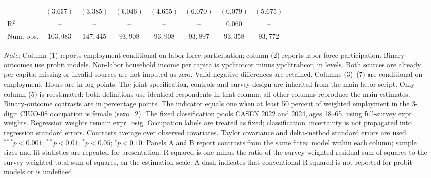 \begin{table}[htpb!]
{\begin{tabular}{l c c c c c c c}
 & $(3.657)$ & $(3.385)$ & $(6.046)$ & $(4.655)$ & $(6.070)$ & $(0.079)$ & $(5.675)$ \\
\hline
R$^2$ & -- & -- & -- & -- & -- & $0.060$ & -- \\
Num. obs. & $103,083$ & $147,445$ & $93,908$ & $93,908$ & $93,897$ & $93,358$ & $93,772$ \\
\hline
\end{tabular}%
}
\par\vspace{1ex}
\begin{minipage}{\textwidth}\footnotesize\raggedright
\textit{Note:} Column (1) reports employment conditional on labor-force participation; column (2) reports labor-force participation. Binary outcomes use probit models. Non-labor household income per capita is ypchtotcor minus ypchtrabcor, in levels. Both sources are already per capita; missing or invalid sources are not imputed as zero. Valid negative differences are retained.  Columns (3)--(7) are conditional on employment. Hours are in log points. The joint specification, controls and survey design are inherited from the main labor script. Only column (5) is reestimated: both definitions use identical respondents in that column; all other columns reproduce the main estimates. Binary-outcome contrasts are in percentage points. The indicator equals one when at least 50 percent of weighted employment in the 3-digit CIUO-08 occupation is female (sexo=2). The fixed classification pools CASEN 2022 and 2024, ages 18--65, using full-survey expr weights. Regression weights remain expr\_osig. Occupation labels are treated as fixed; classification uncertainty is not propagated into regression standard errors. Contrasts average over observed covariates. Taylor covariance and delta-method standard errors are used. $^{***}p<0.001$; $^{**}p<0.01$; $^{*}p<0.05$; $^{\dagger}p<0.10$. Panels A and B report contrasts from the same fitted model within each column; sample sizes and fit statistics are repeated for presentation. R-squared is one minus the ratio of the survey-weighted residual sum of squares to the survey-weighted total sum of squares, on the estimation scale. A dash indicates that conventional R-squared is not reported for probit models or is undefined.
\end{minipage}
\end{table}
